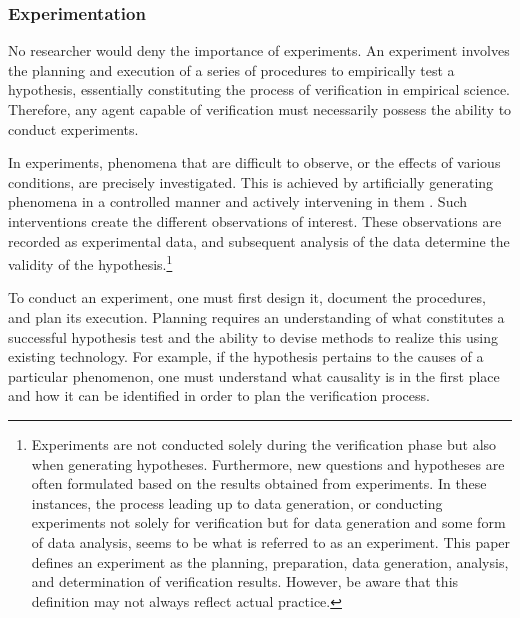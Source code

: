 
\subsubsection{Experimentation}
\label{section-experimentation}
No researcher would deny the importance of experiments. An experiment involves the planning and execution of a series of procedures to empirically test a hypothesis, essentially constituting the process of verification in empirical science. Therefore, any agent capable of verification must necessarily possess the ability to conduct experiments.

In experiments, phenomena that are difficult to observe, or the effects of various conditions, are precisely investigated. This is achieved by artificially generating phenomena in a controlled manner and actively intervening in them \cite{radder2009philosophy}. Such interventions create the different observations of interest. These observations are recorded as experimental data, and subsequent analysis of the data determine the validity of the hypothesis.\footnote{
Experiments are not conducted solely during the verification phase but also when generating hypotheses. Furthermore, new questions and hypotheses are often formulated based on the results obtained from experiments. In these instances, the process leading up to data generation, or conducting experiments not solely for verification but for data generation and some form of data analysis, seems to be what is referred to as an experiment. This paper defines an experiment as the planning, preparation, data generation, analysis, and determination of verification results. However, be aware that this definition may not always reflect actual practice.
}

To conduct an experiment, one must first design it, document the procedures, and plan its execution. Planning requires an understanding of what constitutes a successful hypothesis test and the ability to devise methods to realize this using existing technology. For example, if the hypothesis pertains to the causes of a particular phenomenon, one must understand what causality is in the first place and how it can be identified in order to plan the verification process. 

